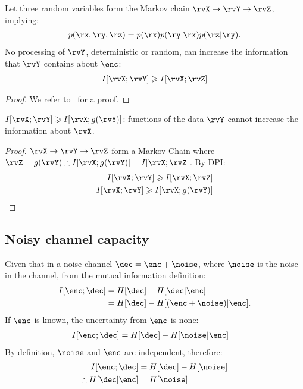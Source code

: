 \begin{theorem}
	[DPI] Let three random variables form the Markov chain \(\rvX \rightarrow \rvY \rightarrow \rvZ\), implying:
	\begin{align}
		p(\rx,\ry,\rz)=p(\rx)p(\ry|\rx)p(\rz|\ry).
	\end{align}
	No processing of \(\rvY\), deterministic or random, can increase the information that \(\rvY\) contains about $\enc$:
	\begin{align}
		I[\rvX;\rvY] \geqslant I[\rvX;\rvZ]
	\end{align}
\end{theorem}
\begin{proof}
	We refer to~\cite[th.2.8.1]{cover:2006} for a proof.
\end{proof}
\begin{theorem}
	 $I[\rvX;\rvY]\geqslant I[\rvX;g(\rvY)]$: functions of the data $\rvY$ cannot increase the information about $\rvX$.\label{th:reparemetrisation_invariance}
\end{theorem}
\begin{proof}
	\(\rvX \rightarrow \rvY \rightarrow \rvZ\) form a Markov Chain	where $\rvZ=g(\rvY) \therefore I[\rvX;g(\rvY)]=I[\rvX;\rvZ]$. By DPI:\@
	\begin{align}
		I[\rvX;\rvY] \geqslant I[\rvX;\rvZ]\\
		I[\rvX;\rvY] \geqslant I[\rvX;g(\rvY)]
	\end{align}
\end{proof}



\subsection{Noisy channel capacity}
Given that in a noise channel \(\dec = \enc + \noise \), where \(\noise\) is the noise in the channel, from the mutual information definition:
\begin{align}
	I[\enc;\dec]&=H[\dec] - H[\dec|\enc]\\
	&=H[\dec] - H[(\enc + \noise)|\enc].
\end{align}
If $\enc$ is known, the uncertainty from $\enc$ is none:
\begin{align}
	I[\enc;\dec]&=H[\dec] - H[\noise|\enc]
\end{align}
By definition, $\noise$ and $\enc$ are independent, therefore:
\begin{align}
	I[\enc;\dec]&=H[\dec] - H[\noise]\\
	\therefore H[\dec|\enc] &= H[\noise]
\end{align}

